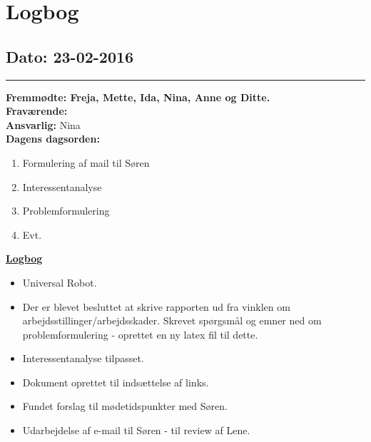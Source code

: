 \chapter{Logbog}
\section{Dato: 23-02-2016}
\hrule
\textbf{Fremmødte: Freja, Mette, Ida, Nina, Anne og Ditte.} \\
\textbf{Fraværende: } \\
\textbf{Ansvarlig:} Nina  \\
\textbf{Dagens dagsorden: }
\begin{enumerate}
	\item Formulering af mail til Søren
	\item Interessentanalyse
	\item Problemformulering
	\item Evt. 
\end{enumerate}

\underline{\textbf{Logbog}}
\begin{itemize}
	\item  Universal Robot.
	\item Der er blevet besluttet at skrive rapporten ud fra vinklen om arbejdsstillinger/arbejdsskader. Skrevet spørgsmål og emner ned om problemformulering - oprettet en ny latex fil til dette. 
	\item Interessentanalyse tilpasset. 
	\item Dokument oprettet til indsættelse af links.
	\item Fundet forslag til mødetidspunkter med Søren. 
	\item Udarbejdelse af e-mail til Søren - til review af Lene.
\end{itemize}

\newpage